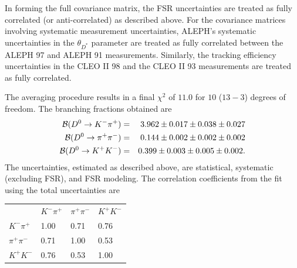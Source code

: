 In forming the full covariance matrix, the FSR
uncertainties are treated as fully correlated (or anti-correlated) as 
described above.  %
For the covariance matrices involving systematic measurement uncertainties, ALEPH's systematic %
uncertainties in the $\theta_{D^*}$ parameter are treated
as fully correlated between the ALEPH 97 and ALEPH 91 measurements.  Similarly,
the tracking efficiency uncertainties in the CLEO II 98 and the
CLEO II 93 measurements are treated as fully correlated.  

The averaging procedure results in a 
final $\chi^2$ of $11.0$ for $10$ ($13-3$) degrees 
of freedom.  The branching
fractions obtained are
\begin{eqnarray*}
  {\cal B}(D^0\to K^-\pi^+)   & = & 3.962 \pm 0.017 \pm 0.038 \pm 0.027 \\
  {\cal B}(D^0\to \pi^+\pi^-) & = & 0.144 \pm 0.002 \pm 0.002 \pm 0.002 \\
  {\cal B}(D^0\to K^+ K^-)    & = & 0.399 \pm 0.003 \pm 0.005 \pm 0.002. 
\end{eqnarray*}The uncertainties, estimated as described above, are statistical, 
systematic (excluding FSR), and
FSR modeling.  The correlation coefficients from the fit using the 
total uncertainties are
\begin{center}
\begin{tabular}{llll}
               & $K^-\pi^+$ & $\pi^+\pi^-$ & $K^+ K^-$ \\
$K^-\pi^+$     &  1.00 & 0.71 & 0.76  \\
$\pi^+\pi^-$   &  0.71 & 1.00 & 0.53  \\
$K^+ K^-$      &  0.76 & 0.53 & 1.00  \\
\end{tabular}
\end{center}

